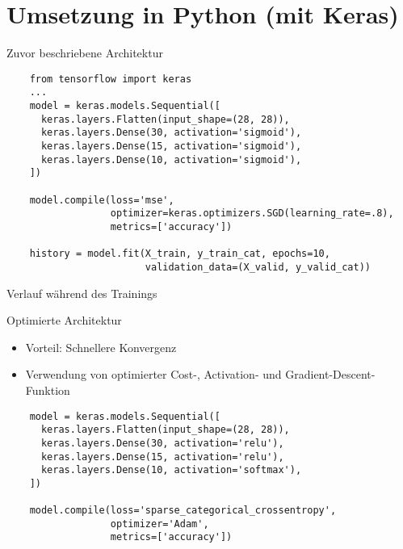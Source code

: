 \section{Umsetzung in Python (mit Keras)}

\begin{frame}[fragile]{Zuvor beschriebene Architektur}
  \begin{lstlisting}
    from tensorflow import keras
    ...
    model = keras.models.Sequential([
      keras.layers.Flatten(input_shape=(28, 28)),
      keras.layers.Dense(30, activation='sigmoid'),
      keras.layers.Dense(15, activation='sigmoid'),
      keras.layers.Dense(10, activation='sigmoid'),
    ])

    model.compile(loss='mse',
                  optimizer=keras.optimizers.SGD(learning_rate=.8),
                  metrics=['accuracy'])

    history = model.fit(X_train, y_train_cat, epochs=10,
                        validation_data=(X_valid, y_valid_cat))
  \end{lstlisting}
\end{frame}

\begin{frame}{Verlauf während des Trainings}
  \begin{center}
  \end{center}
\end{frame}

\begin{frame}[fragile]{Optimierte Architektur}
  \begin{itemize}
  \item Vorteil: Schnellere Konvergenz
  \item Verwendung von optimierter Cost-, Activation- und Gradient-Descent-Funktion
  \end{itemize}
  \begin{lstlisting}
    model = keras.models.Sequential([
      keras.layers.Flatten(input_shape=(28, 28)),
      keras.layers.Dense(30, activation='relu'),
      keras.layers.Dense(15, activation='relu'),
      keras.layers.Dense(10, activation='softmax'),
    ])

    model.compile(loss='sparse_categorical_crossentropy',
                  optimizer='Adam',
                  metrics=['accuracy'])
  \end{lstlisting}
\end{frame}

